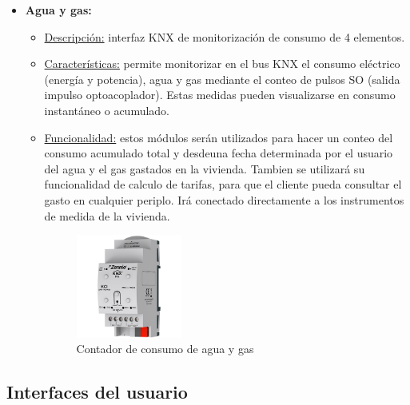 \begin{itemize}
\item \textbf{Agua y gas:} 
	\begin{itemize}
	\item\underline{Descripción:} interfaz KNX de monitorización de consumo de 4 elementos.
	\item \underline{Características:} permite monitorizar en el bus KNX el consumo eléctrico (energía y potencia), agua y gas mediante el conteo de pulsos SO (salida impulso optoacoplador). Estas medidas pueden visualizarse en consumo instantáneo o acumulado.
	\item \underline{Funcionalidad:} estos módulos serán utilizados para hacer un conteo del consumo acumulado total y desdeuna fecha determinada por el usuario del agua y el gas gastados en la vivienda. Tambien se utilizará su funcionalidad de calculo de tarifas, para que el cliente pueda consultar el gasto en cualquier periplo. Irá conectado directamente a los instrumentos de medida de la vivienda.
	\begin{figure}[h]
	\centering
	\includegraphics[width=0.35\textwidth]{figures/contador_agua.png}   
	\caption{Contador de consumo de agua y gas}
	\label{fig:contador_agua}
	\end{figure}
	\end{itemize} 
\end{itemize} 

\subsection{Interfaces del usuario}

